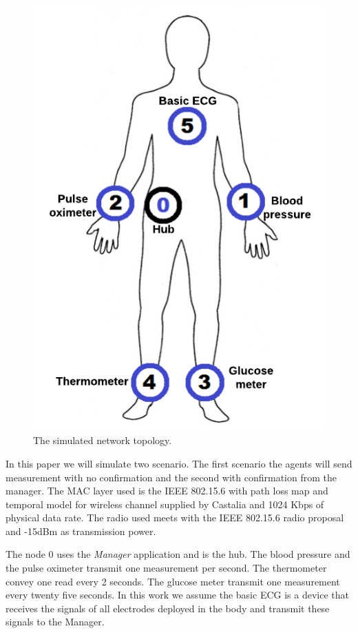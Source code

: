 \begin{figure}[htbp]
\centerline{\includegraphics[scale=0.31]{figures/corpoSensoresNomes.png}}
\caption{The simulated network topology.}
\label{fig:wbantopology}
\end{figure}

In this paper we will simulate two scenario. The first scenario the agents will send measurement with no confirmation and the second with confirmation from the manager. The MAC layer used is the IEEE 802.15.6 with path loss map and temporal model for wireless channel supplied by Castalia and 1024 Kbps of physical data rate. The radio used meets with the IEEE 802.15.6 radio proposal \cite{5} and -15dBm as transmission power.

The node 0 uses the \textit{Manager} application and is the hub. The blood pressure and the pulse oximeter transmit one measurement per second. The thermometer convey one read every 2 seconds. The glucose meter  transmit one measurement every twenty five seconds. In this work we assume the basic ECG is a device that receives the signals of all electrodes deployed in the body and transmit these signals to the Manager.  